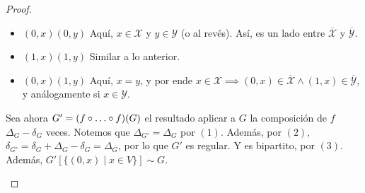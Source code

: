 \begin{proof}
\begin{itemize}
\begin{enumerate}
\begin{itemize}
            \item $(0,x)(0,y)$ Aquí, $x \in \mathcal{X}$ y $y \in \mathcal{Y}$ (o al revés). Así, es un lado entre $\overline{\mathcal{X}}$ y $\overline{\mathcal{Y}}$.
            \item $(1,x)(1,y)$ Similar a lo anterior.
            \item $(0,x)(1,y)$ Aquí, $x = y$, y por ende $x \in \mathcal{X} \implies (0,x) \in \overline{\mathcal{X}} \wedge (1,x) \in \overline{\mathcal{Y}}$, y análogamente si $x \in \mathcal{Y}$.
        \end{itemize}
    \end{enumerate}
    Sea ahora $G' = (f \circ \mathellipsis \circ f)(G)$ el resultado aplicar a $G$ la composición de $f$ $\Delta_G - \delta_G$ veces. Notemos que $\Delta_{G'} = \Delta_G$ por $(1)$. Además, por $(2)$, $\delta_{G'} = \delta_G + \Delta_G - \delta_G = \Delta_G$, por lo que $G'$ es regular. Y es bipartito, por $(3)$. Además, $G'[\{ (0,x) \mid x \in V \}] \sim G$.
\end{itemize}
\end{proof}